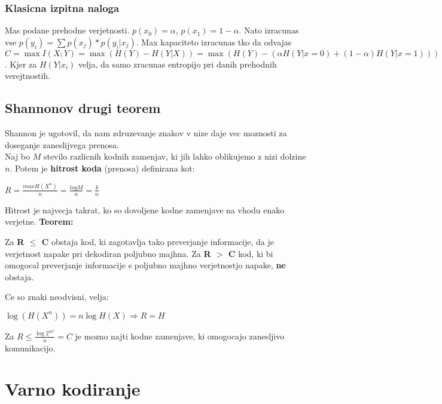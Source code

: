 \documentclass{article}
\begin{document}
\begin{multicols}{4}
\subsubsection{Klasicna izpitna naloga}
Mas podane prehodne verjetnosti. $p(x_0) = \alpha$, $p(x_1) = 1 - \alpha$. Nato izracunas
vse $p(y_i) = \sum p(x_j) * p(y_i | x_j)$. Max kapaciteto izracunas tko da odvajas
$C = \max I (X;Y) = \max (H(Y) - H(Y|X)) = \max (H(Y) - (\alpha H(Y | x = 0) + (1 - \alpha) H(Y | x = 1)))$. Kjer za $H(Y | x_i)$ velja, da samo
zracunas entropijo pri danih prehodnih verejtnostih.

\subsection{Shannonov drugi teorem}
Shannon je ugotovil, da nam zdruzevanje znakov v nize daje vec moznosti za doseganje zaneslijvega prenosa.\\
Naj bo $M$ stevilo razlicnih kodnih zamenjav, ki jih lahko oblikujemo z nizi dolzine $n$. Potem je \textbf{hitrost koda}
(prenosa)  definirana kot:
\begin{center}
    \begin{math}
        R = \frac{max H(X^n)}{n} = \frac{log M}{n} = \frac{k}{n}
    \end{math}
\end{center}
Hitrost je najvecja takrat, ko so dovoljene kodne zamenjave na vhodu enako verjetne.
\textbf{Teorem:}\\
\begin{center}
    Za \textbf{R $\leq$ C} obstaja kod, ki zagotavlja tako preverjanje informacije, da je verjetnost napake pri
    dekodiran  poljubno majhna. Za \textbf{R $>$ C} kod, ki bi omogocal preverjanje informacije s poljubno majhno
    verjetnostjo napake, \textbf{ne} obstaja.
\end{center}
Ce so znaki neodvisni, velja:
\begin{center}
    \begin{math}
        \log(H(X^n)) = n \log H(X) \Rightarrow R = H
    \end{math}
\end{center}
Za $R \leq \frac{\log 2^{nC}}{n} = C$ je mozno najti kodne zamenjave, ki omogocajo zanesljivo komunikacijo.

\section{Varno kodiranje}


\end{multicols}
\end{document}
